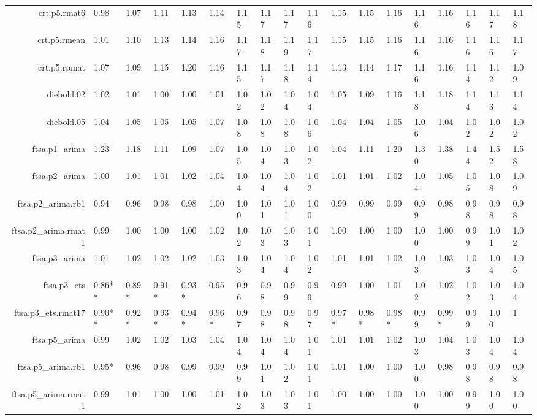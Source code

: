 \begin{table}[ht]
{\begin{tabular}{rlllllllllllllllll}
  crt.p5.rmat6 & 0.98 & 1.07 & 1.11 & 1.13 & 1.14 & 1.15 & 1.17 & 1.17 & 1.16 & 1.15 & 1.15 & 1.16 & 1.16 & 1.16 & 1.16 & 1.17 & 1.18 \\ 
  crt.p5.rmean & 1.01 & 1.10 & 1.13 & 1.14 & 1.16 & 1.17 & 1.18 & 1.19 & 1.17 & 1.15 & 1.15 & 1.16 & 1.16 & 1.16 & 1.16 & 1.16 & 1.17 \\ 
  crt.p5.rpmat & 1.07 & 1.09 & 1.15 & 1.20 & 1.16 & 1.15 & 1.17 & 1.18 & 1.14 & 1.13 & 1.14 & 1.17 & 1.16 & 1.16 & 1.14 & 1.12 & 1.09 \\ 
  diebold.02 & 1.02 & 1.01 & 1.00 & 1.00 & 1.01 & 1.02 & 1.02 & 1.04 & 1.04 & 1.05 & 1.09 & 1.16 & 1.18 & 1.18 & 1.14 & 1.13 & 1.14 \\ 
  diebold.05 & 1.04 & 1.05 & 1.05 & 1.05 & 1.07 & 1.08 & 1.08 & 1.08 & 1.06 & 1.04 & 1.04 & 1.05 & 1.06 & 1.04 & 1.02 & 1.02 & 1.02 \\ 
  ftsa.p1\_arima & 1.23 & 1.18 & 1.11 & 1.09 & 1.07 & 1.05 & 1.04 & 1.03 & 1.02 & 1.04 & 1.11 & 1.20 & 1.30 & 1.38 & 1.44 & 1.52 & 1.58 \\ 
  ftsa.p2\_arima & 1.00 & 1.01 & 1.01 & 1.02 & 1.04 & 1.04 & 1.04 & 1.04 & 1.02 & 1.01 & 1.01 & 1.02 & 1.04 & 1.05 & 1.05 & 1.08 & 1.09 \\ 
  ftsa.p2\_arima.rb1 & 0.94 & 0.96 & 0.98 & 0.98 & 1.00 & 1.00 & 1.01 & 1.01 & 1.00 & 0.99 & 0.99 & 0.99 & 0.99 & 0.98 & 0.98 & 0.98 & 0.98 \\ 
  ftsa.p2\_arima.rmat1 & 0.99 & 1.00 & 1.00 & 1.00 & 1.02 & 1.02 & 1.03 & 1.03 & 1.01 & 1.00 & 1.00 & 1.00 & 1.00 & 1.00 & 0.99 & 1.01 & 1.02 \\ 
  ftsa.p3\_arima & 1.01 & 1.02 & 1.02 & 1.02 & 1.03 & 1.03 & 1.04 & 1.04 & 1.02 & 1.01 & 1.01 & 1.02 & 1.03 & 1.03 & 1.03 & 1.04 & 1.05 \\ 
  ftsa.p3\_ets & 0.86** & 0.89* & 0.91* & 0.93* & 0.95 & 0.96 & 0.98 & 0.99 & 0.99 & 0.99 & 1.00 & 1.01 & 1.02 & 1.02 & 1.02 & 1.03 & 1.04 \\ 
  ftsa.p3\_ets.rmat17 & 0.90** & 0.92* & 0.93* & 0.94* & 0.96* & 0.97 & 0.98 & 0.98 & 0.97 & 0.97* & 0.98* & 0.98* & 0.99 & 0.99* & 0.99 & 1.00 & 1 \\ 
  ftsa.p5\_arima & 0.99 & 1.02 & 1.02 & 1.03 & 1.04 & 1.04 & 1.04 & 1.04 & 1.01 & 1.01 & 1.01 & 1.02 & 1.03 & 1.04 & 1.03 & 1.04 & 1.04 \\ 
  ftsa.p5\_arima.rb1 & 0.95* & 0.96 & 0.98 & 0.99 & 0.99 & 0.99 & 1.01 & 1.02 & 1.01 & 1.01 & 1.00 & 1.00 & 1.00 & 0.98 & 0.98 & 0.98 & 0.98 \\ 
  ftsa.p5\_arima.rmat1 & 0.99 & 1.01 & 1.00 & 1.00 & 1.01 & 1.02 & 1.03 & 1.03 & 1.01 & 1.00 & 1.00 & 1.00 & 1.00 & 1.00 & 0.99 & 1.00 & 1.00 \\ 

\end{tabular}}
\end{table}
